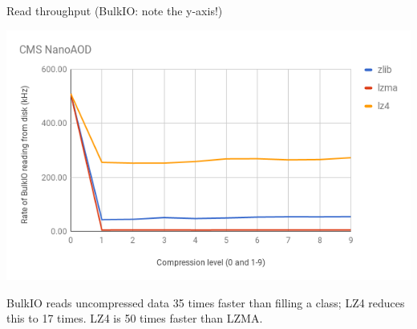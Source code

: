 \documentclass{beamer}
\begin{document}
\begin{frame}{Read throughput (BulkIO: note the y-axis!)}
\begin{center}
\includegraphics[width=\linewidth]{bulk-vs-compression.png}
\end{center}

BulkIO reads uncompressed data 35 times faster than filling a class; LZ4 reduces this to 17 times. LZ4 is 50 times faster than LZMA.
\end{frame}
\end{document}
